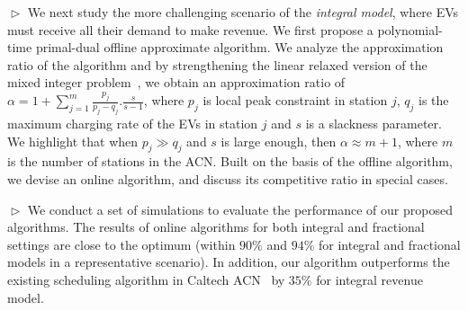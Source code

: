 \documentclass[journal]{IEEEtran}
\newcommand{\rev}[1]{{\color{black}#1}}%
\newcommand{\rev}[1]{#1}
\begin{document}
$\vartriangleright$ We next study \rev{the} more challenging scenario of \rev{the} \textit{integral model}\rev{, }where EVs must receive all their demand to make revenue. We first propose a polynomial-time primal-dual offline approximate algorithm. We analyze the approximation ratio of the algorithm and by strengthening the linear relaxed version of the mixed integer problem~\cite{Carr}, we obtain an approximation ratio of $\alpha =1+\sum_{j=1}^m {\frac{p_j}{p_j-q_j}}.\frac{s}{s-1}$, where $p_j$ is local peak constraint in station $j$, $q_j$ is the maximum charging rate of the EVs in station $j$ and $s$ is a slackness parameter. We highlight that when $p_j \gg q_j$ and $s$ is \rev{large} enough, then $\alpha \approx m+1$, where $m$ is the number of stations in the ACN. Built on the basis of the offline algorithm, we devise an online algorithm, and discuss its competitive ratio in special cases. 

$\vartriangleright$ We conduct a set of  simulations to evaluate the performance of our proposed algorithms. 
The results of online algorithms for both integral and fractional settings are close to the optimum (within $90\%$ and $94\%$ for integral and fractional models in a representative scenario). In addition, our algorithm outperforms the existing scheduling algorithm in Caltech ACN~\cite{lee2016adaptive} by $35\%$ for integral revenue model.


\end{document}
